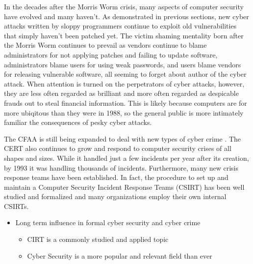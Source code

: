 In the decades after the Morris Worm crisis, many aspects of computer security
have evolved and many haven't. As demonstrated in previous sections, new cyber
attacks written by sloppy programmers continue to exploit old
vulnerabilities that simply haven't been patched yet. The victim shaming
mentality born after the Morris Worm continues to prevail as vendors continue
to blame administrators for not applying patches and failing to update
software, administrators blame users for using weak passwords, and users blame
vendors for releasing vulnerable software, all seeming to forget about
author of the cyber attack. When attention is turned on the perpetrators of
cyber attacks, however, they are less often regarded as brilliant and more often
regarded as despicable frauds out to steal financial information. This is likely
because computers are for more ubiqitous than they were in 1988, so the general
public is more intimately familiar the consequences of pesky cyber attacks.

The CFAA is still being expanded to deal with new types of cyber crime
\cite{adams_controlling_1996}. The CERT also continues to grow and respond to
computer security crises of all shapes and sizes. While it handled just a few
incidents per year after its creation, by 1993 it was handling thousands of
incidents\cite{fithen_cert_1994}. Furthermore, many new crisis response teams
have been established. In fact, the procedure to set up and maintain a Computer
Security Incident Response Teams (CSIRT) has been well studied and formalized
and many organizations employ their own internal CSIRTs.


\begin{itemize}
	\item Long term influence in formal cyber security and cyber crime
    	\begin{itemize}
        \item CIRT is a commonly studied and applied topic
        \item Cyber Security is a more popular and relevant field than ever
    	\end{itemize}
\end{itemize}


